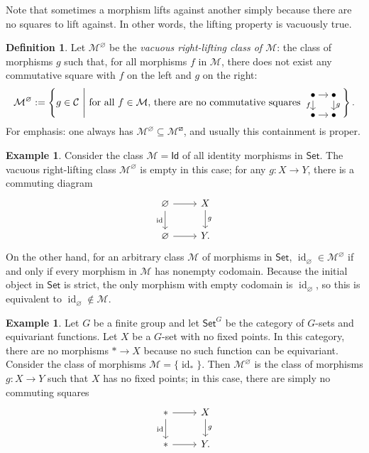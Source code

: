 \documentclass{amsart}
\renewcommand\emptyset\varnothing
\newcommand{\Set}{\mathsf{Set}}
\newcommand{\GSet}{\Set^G}
\newcommand{\catC}{\mathcal{C}}
\DeclareMathOperator{\id}{id}
\numberwithin{equation}{section}
\theoremstyle{definition}
\newtheorem{definition}[equation]{Definition}
\newtheorem{example}[equation]{Example}
\begin{document}
Note that sometimes a morphism lifts against another simply because there are no squares to lift against. In other words, the lifting property is vacuously true.

\begin{definition}
	Let $\mathcal{M}^\emptyset$ be the \emph{vacuous right-lifting class of $\mathcal{M}$}: the class of morphisms $g$ such that, for all morphisms $f$ in $\mathcal{M}$, there does not exist any commutative square with $f$ on the left and $g$ on the right:
	\[
		\mathcal{M}^\emptyset :=
		\left\{
		g \in \catC
		\ \middle\vert\
		\text{for all } f \in \mathcal{M} \text{, there are no commutative squares }
		\begin{tikzcd}[cramped, sep=1em]
			\bullet \ar[d, "f"'] \ar[r] & \bullet \ar[d, "g"] \\
			\bullet \ar[r] & \bullet
		\end{tikzcd}
		\right\}.
	\]
	For emphasis: one always has $\mathcal{M}^\emptyset \subseteq \mathcal{M}^\boxslash$, and usually this containment is proper.
\end{definition}

\begin{example}
	Consider the class $\mathcal M = \textsf{Id}$ of all identity morphisms in $\Set$. The vacuous right-lifting class $\mathcal M^\emptyset$ is empty in this case; for any $g \colon X \to Y$, there is a commuting diagram
	\[
		\begin{tikzcd}
			\emptyset \ar[r] \ar[d,"\id"'] & X \ar[d, "g"] \\
			\emptyset \ar[r] & Y.
		\end{tikzcd}
	\]
	On the other hand, for an arbitrary class $\mathcal M$ of morphisms in $\Set$, $\id_\emptyset \in \mathcal{M}^\emptyset$ if and only if every morphism in $\mathcal M$ has nonempty codomain. Because the initial object in $\Set$ is strict, the only morphism with empty codomain is $\id_\emptyset$, so this is equivalent to $\id_\emptyset \notin \mathcal M$.
\end{example}


\begin{example}
	Let $G$ be a finite group and let $\GSet$ be the category of $G$-sets and equivariant functions. Let $X$ be a $G$-set with no fixed points. In this category, there are no morphisms $\ast \to X$ because no such function can be equivariant. Consider the class of morphisms $\mathcal M = \{\id_\ast\}$. Then $\mathcal M^\emptyset$ is the class of morphisms $g \colon X \to Y$ such that $X$ has no fixed points; in this case, there are simply no commuting squares
	\[
		\begin{tikzcd}
			\ast \ar[r]\ar[d, "\id"'] & X \ar[d, "g"] \\
			\ast \ar[r] & Y.
		\end{tikzcd}
	\]
\end{example}
\end{document}
